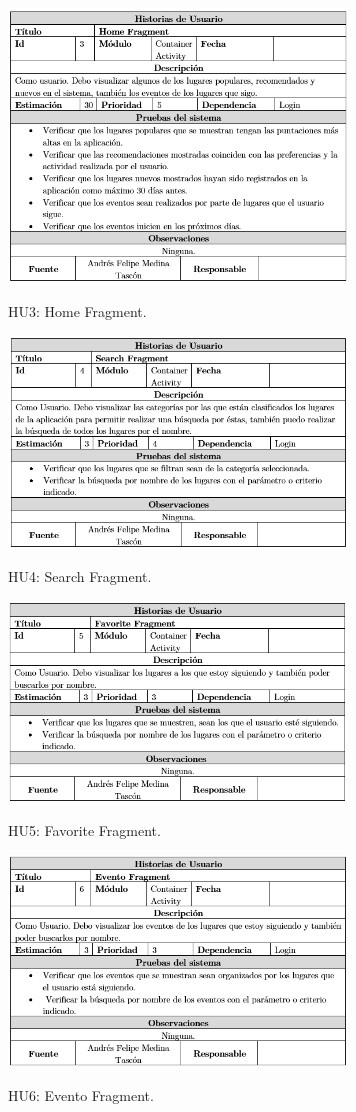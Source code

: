 \documentclass[12pt,letterpaper,openany]{book}
\begin{document}
\begin{table}[H]
\centering
\includegraphics[width=9cm]{./imagenes/HU/HU3}
\caption{HU3: Home Fragment.}
\end{table}

\begin{table}[H]
\centering
\includegraphics[width=9cm]{./imagenes/HU/HU4}
\caption{HU4: Search Fragment.}
\end{table}

\begin{table}[H]
\centering
\includegraphics[width=9cm]{./imagenes/HU/HU5}
\caption{HU5: Favorite Fragment.}
\end{table}

\begin{table}[H]
\centering
\includegraphics[width=9cm]{./imagenes/HU/HU6}
\caption{HU6: Evento Fragment.}
\end{table}
\end{document}
